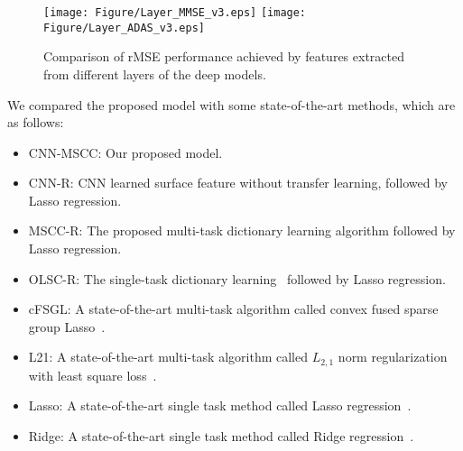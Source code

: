 \documentclass[10pt,twocolumn,letterpaper]{article}
\begin{document}
\begin{figure}
\vspace{-1.3em}
\centering
\texttt{[image: Figure/Layer\_MMSE\_v3.eps]}
\texttt{[image: Figure/Layer\_ADAS\_v3.eps]}
\vspace{-0.5em}
\caption{Comparison of rMSE performance achieved by features extracted from different layers of the deep models.}
\label{fig:7}

\end{figure}


We compared the proposed model with some state-of-the-art methods, which are as follows:
\begin{itemize}
  \item CNN-MSCC: Our proposed model.
  \item CNN-R: CNN learned surface feature without transfer learning, followed by Lasso regression.
  \item MSCC-R: The proposed multi-task dictionary learning algorithm followed by Lasso regression.
  \item OLSC-R: The single-task dictionary learning~\cite{mairal2009online} followed by Lasso regression.
  \item cFSGL: A state-of-the-art multi-task algorithm called convex fused sparse group Lasso~\cite{zhou2013modeling}.
  \item L21: A state-of-the-art multi-task algorithm called $L_{2, 1}$ norm regularization with least square loss~\cite{argyriou2008convex}.
  \item Lasso: A state-of-the-art single task method called Lasso regression~\cite{tibshirani1996regression}.
  \item Ridge: A state-of-the-art single task method called Ridge regression~\cite{hoerl1970ridge}.
\end{itemize}
\end{document}

